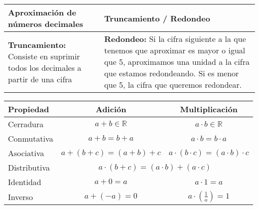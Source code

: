 \documentclass[12pt,a4paper]{article}
\begin{document}
\vspace{1cm}

\begin{center}
\begin{tabular}{|p{}|p{}|}
\hline
\cellcolor{fondoverde}\textbf{Aproximación de números decimales} & \cellcolor{fondorosa}\textbf{Truncamiento / Redondeo} \\
\hline
\textbf{Truncamiento:} Consiste en suprimir todos los decimales a partir de una cifra &
\textbf{Redondeo:} Si la cifra siguiente a la que tenemos que aproximar es mayor o igual que 5, aproximamos una unidad a la cifra que estamos redondeando. Si es menor que 5, la cifra que queremos redondear.\\
\hline
\end{tabular}
\end{center}

\vspace{1cm}

\begin{center}
\begin{tabular}{|l|c|c|}
\hline
\cellcolor{fondoazul}\textbf{Propiedad} & \cellcolor{fondoazul}\textbf{Adición} & \cellcolor{fondoazul}\textbf{Multiplicación} \\
\hline
Cerradura & $a + b \in \mathbb{R}$ & $a \cdot b \in \mathbb{R}$ \\
\hline
Conmutativa & $a + b = b + a$ & $a \cdot b = b \cdot a$ \\
\hline
Asociativa & $a + (b + c) = (a + b) + c$ & $a \cdot (b \cdot c) = (a \cdot b) \cdot c$ \\
\hline
Distributiva & \multicolumn{2}{c|}{$a \cdot (b + c) = (a \cdot b) + (a \cdot c)$} \\
\hline
Identidad & $a + 0 = a$ & $a \cdot 1 = a$ \\
\hline
Inverso & $a + (−a) = 0$ & $a \cdot \left(\frac{1}{a}\right) = 1$ \\
\hline
\end{tabular}
\end{center}

\vspace{1cm}
\end{document}
